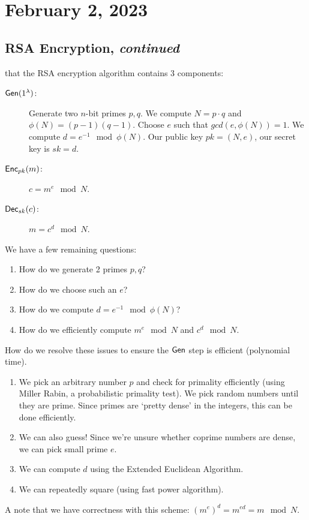 \section{February 2, 2023}
\subsection{RSA Encryption, \emph{continued}}
\recall that the RSA encryption algorithm contains 3 components:
\begin{description}
    \item[$\operatorname{\mathsf{Gen}}(1^\lambda)$:] Generate two $n$-bit primes $p, q$. We compute $N = p\cdot q$ and $\phi(N) = (p-1)(q-1)$. Choose $e$ such that $gcd(e, \phi(N)) = 1$. We compute $d = e^{-1}\mod{\phi(N)}$. Our public key $pk = (N, e)$, our secret key is $sk = d$.
    \item[$\operatorname{\mathsf{Enc}}_{pk}(m)$:] $c = m^e\mod{N}$.
    \item[$\operatorname{\mathsf{Dec}}_{sk}(c)$:] $m = c^d\mod{N}$.
\end{description}
We have a few remaining questions:
\begin{enumerate}
    \item How do we generate 2 primes $p, q$?
    \item How do we choose such an $e$?
    \item How do we compute $d = e^{-1}\mod{\phi(N)}$?
    \item How do we efficiently compute $m^e\mod{N}$ and $c^d\mod N$.
\end{enumerate}
How do we resolve these issues to ensure the $\operatorname{\mathsf{Gen}}$ step is efficient (polynomial time).
\begin{enumerate}
    \item We pick an arbitrary number $p$ and check for primality efficiently (using Miller Rabin, a probabilistic primality test). We pick random numbers until they are prime. Since primes are `pretty dense' in the integers, this can be done efficiently.
    \item We can also guess! Since we're unsure whether coprime numbers are dense, we can pick small prime $e$.
    \item We can compute $d$ using the Extended Euclidean Algorithm.
    \item We can repeatedly square (using fast power algorithm).
\end{enumerate}

A note that we have correctness with this scheme: $(m^e)^d= m^{ed} = m\mod N$.

